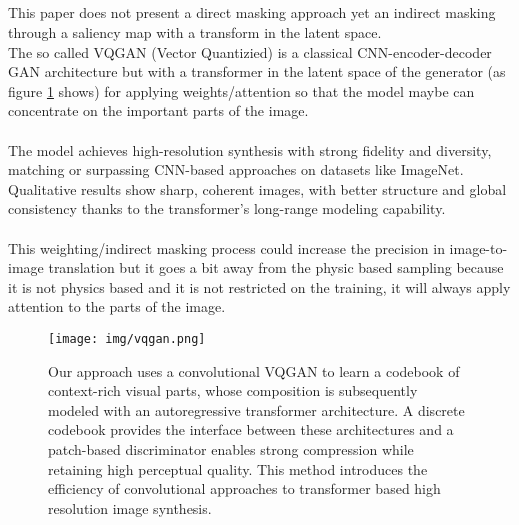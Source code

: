 		\subsection{}
			This paper does not present a direct masking approach yet an indirect masking through a saliency map with a transform in the latent space.\\
			The so called VQGAN (Vector Quantizied) is a classical CNN-encoder-decoder GAN architecture but with a transformer in the latent space of the generator (as figure \ref{fig:vqgan} shows) for applying weights/attention so that the model maybe can concentrate on the important parts of the image.\\
			\\
			The model achieves high-resolution synthesis with strong fidelity and diversity, matching or surpassing CNN-based approaches on datasets like ImageNet. Qualitative results show sharp, coherent images, with better structure and global consistency thanks to the transformer’s long-range modeling capability.\\
			\\
			This weighting/indirect masking process could increase the precision in image-to-image translation but it goes a bit away from the physic based sampling because it is not physics based and it is not restricted on the training, it will always apply attention to the parts of the image.
			
			\begin{figure}[H]
				\centering
				\texttt{[image: img/vqgan.png]}
				\caption[VQGAN]{Our approach uses a convolutional VQGAN to learn a codebook of context-rich visual parts, whose composition is subsequently modeled with an autoregressive transformer architecture. A discrete codebook provides the interface between these architectures and a patch-based discriminator enables strong compression while retaining high perceptual quality. This method introduces the efficiency of convolutional approaches to transformer based high resolution image synthesis.}
				\label{fig:vqgan}
			\end{figure}

		
		





